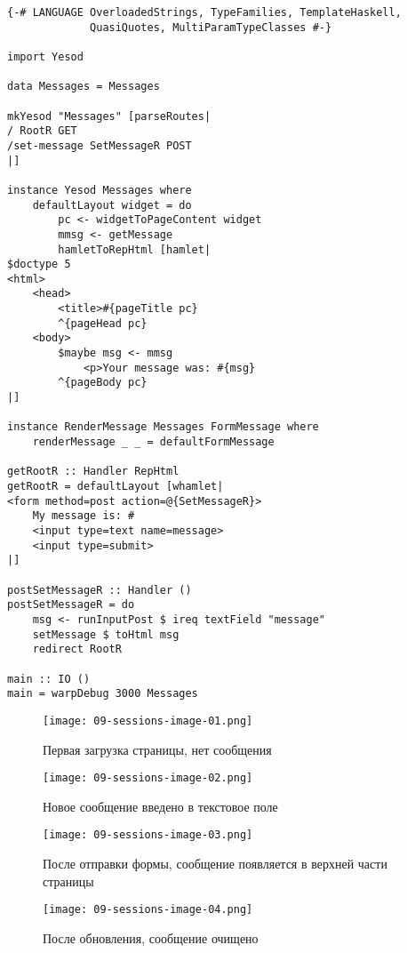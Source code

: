 \begin{lstlisting}
{-# LANGUAGE OverloadedStrings, TypeFamilies, TemplateHaskell,
             QuasiQuotes, MultiParamTypeClasses #-}

import Yesod

data Messages = Messages

mkYesod "Messages" [parseRoutes|
/ RootR GET
/set-message SetMessageR POST
|]

instance Yesod Messages where
    defaultLayout widget = do
        pc <- widgetToPageContent widget
        mmsg <- getMessage
        hamletToRepHtml [hamlet|
$doctype 5
<html>
    <head>
        <title>#{pageTitle pc}
        ^{pageHead pc}
    <body>
        $maybe msg <- mmsg
            <p>Your message was: #{msg}
        ^{pageBody pc}
|]

instance RenderMessage Messages FormMessage where
    renderMessage _ _ = defaultFormMessage

getRootR :: Handler RepHtml
getRootR = defaultLayout [whamlet|
<form method=post action=@{SetMessageR}>
    My message is: #
    <input type=text name=message>
    <input type=submit>
|]

postSetMessageR :: Handler ()
postSetMessageR = do
    msg <- runInputPost $ ireq textField "message"
    setMessage $ toHtml msg
    redirect RootR

main :: IO ()
main = warpDebug 3000 Messages
\end{lstlisting}

\begin{figure}[tbh]
  \centering
  \texttt{[image: 09-sessions-image-01.png]}
  \caption{Первая загрузка страницы, нет сообщения}
\end{figure}

\begin{figure}[tbh]
  \centering
  \texttt{[image: 09-sessions-image-02.png]}
  \caption{Новое сообщение введено в текстовое поле}
\end{figure}

\begin{figure}[tbh]
  \centering
  \caption{После отправки формы, сообщение появляется в верхней части страницы}
  \texttt{[image: 09-sessions-image-03.png]}
\end{figure}

\begin{figure}[tbh]
  \centering
  \caption{После обновления, сообщение очищено}
  \texttt{[image: 09-sessions-image-04.png]}
\end{figure}

